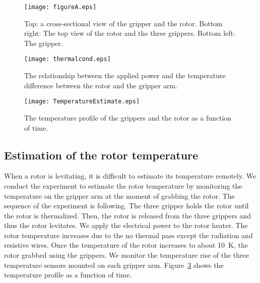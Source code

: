 \documentclass[journal]{IEEEtran}
\begin{document}

\begin{figure}[htb]
   \centering
   \texttt{[image: figureA.eps]} %
   \caption{Top: a cross-sectional view of the gripper and the rotor. Bottom right: The top view of the rotor and the three grippers. Bottom left: The gripper.}
   \label{fig:figureA}
\end{figure}

\begin{figure}[htb]
   \centering
   \texttt{[image: thermalcond.eps]} %
   \caption{The relationship between the applied power and the temperature difference between the rotor and the gripper arm. }
   \label{fig:thermalcond}
\end{figure}

\begin{figure}[htb]
   \centering
   \texttt{[image: TemperatureEstimate.eps]} %
   \caption{The temperature profile of the grippers and the rotor as a function of time. }
   \label{fig:TemperatureEstimate}
\end{figure}

\subsection{Estimation of the rotor temperature}
When a rotor is levitating, it is difficult to estimate its temperature remotely.
We conduct the experiment to estimate the rotor temperature by monitoring the temperature on the gripper arm at the moment of grabbing the rotor.
The sequence of the experiment is following.
The three gripper holds the rotor until the rotor is thermalized.
Then, the rotor is released from the three grippers and thus the rotor levitates.
We apply the electrical power to the rotor heater.
The rotor temperature increases due to the no thermal pass except the radiation and resistive wires.
Once the temperature of the rotor increases to about 10~K, the rotor grabbed using the grippers.
We monitor the temperature rise of the three temperature sensors mounted on each gripper arm.
Figure~\ref{fig:TemperatureEstimate} shows the temperature profile as a function of time.
\end{document}
